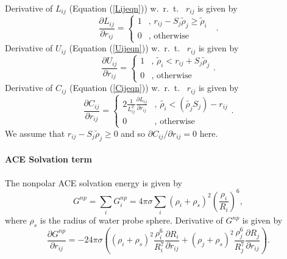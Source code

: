 \documentclass[12pt]{article}
\begin{document}
Derivative of $L_{ij}$ (Equation (\ref{Lijeqn})) w.~r.~t.~ $r_{ij}$ is given by
\begin{equation}
\frac{\partial L_{ij}}{\partial r_{ij}} = \left\{ \begin{array}{rl}
    1 &\mbox{, $r_{ij} - S_{j}\tilde{\rho}_{j} {\geq} \tilde{\rho}_{i}$ } \\
    0 &\mbox{, otherwise} 
    \end{array} \right..
\end{equation}
Derivative of $U_{ij}$ (Equation (\ref{Uijeqn})) w.~r.~t.~ $r_{ij}$ is given by
\begin{equation}
\frac{\partial U_{ij}}{\partial r_{ij}} = \left\{ \begin{array}{rl}
    1 &\mbox{, $\tilde{\rho}_{i} < r_{ij} + S_{j}\tilde{\rho}_{j}$} \\
    0 &\mbox{, otherwise}
    \end{array} \right..
\end{equation}
Derivative of $C_{ij}$ (Equation (\ref{Cijeqn})) w.~r.~t.~ $r_{ij}$ is given by
\begin{equation}
\frac{\partial C_{ij}}{\partial r_{ij}} = \left\{ \begin{array}{rl}
  2\frac{1}{L_{ij}^{2}}\frac{\partial L_{ij}}{\partial r_{ij}} &\mbox{, $\tilde{{\rho}_{i}} < ( \tilde{{\rho}_{j}}S_{j}) - r_{ij}$} \\
  0 &\mbox{, otherwise}
  \end{array} \right..
\end{equation}
We assume that $r_{ij} - S_{j}\tilde{\rho}_{j} {\geq} 0$ and so $\partial C_{ij}/\partial r_{ij}=0$ here.

\paragraph{ACE Solvation term}
The nonpolar ACE solvation energy is given by
\begin{equation}
\label{ACEsolvation}
G^{np} = \displaystyle\sum_{i}G_{i}^{np} = 4{\pi}{\sigma}\displaystyle\sum_{i}({\rho}_{i} + {\rho}_{s})^{2}\left(\frac{{\rho}_{i}}{R_{i}}\right)^{6},
\end{equation}
where ${\rho}_{s}$ is the radius of water probe sphere.
Derivative of $G^{np}$ is given by
\begin{equation}
\frac{\partial G^{np}}{\partial r_{ij}} = -24{\pi}{\sigma}\left( (\rho_{i} + \rho_{s})^{2}\frac{{\rho}_{i}^{6}}{R_{i}^{7}}\frac{\partial R_{i}}{\partial r_{ij}} + (\rho_{j} + \rho_{s})^{2}\frac{{\rho}_{j}^{6}}{R_{j}^{7}}\frac{\partial R_{j}}{\partial r_{ij}} \right).
\end{equation}
\end{document}
